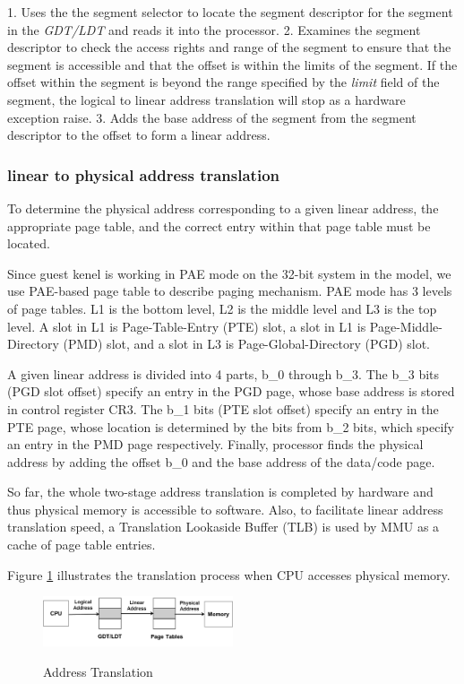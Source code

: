 1. Uses the the segment selector to locate the segment descriptor for the segment in the \emph{GDT/LDT} and reads it into the processor.
2. Examines the segment descriptor to check the access rights and range of the segment to ensure that the segment is accessible and that the offset is within the limits of the segment. If the offset within the segment is beyond the range specified by the \emph{limit} field of the segment, the logical to linear address translation will stop as a hardware exception raise.
3. Adds the base address of the segment from the segment descriptor to the offset to form a linear address.

\subsubsection{linear to physical address translation}
To determine the physical address corresponding to a given linear address, the appropriate page table, and the correct entry within that page table must be located.

Since guest kenel is working in PAE mode on the 32-bit system in the model, we use PAE-based page table to describe paging mechanism. PAE mode has 3 levels of page tables. L1 is the bottom level, L2 is the middle level and L3 is the top level. A slot in L1 is Page-Table-Entry (PTE) slot, a slot in L1 is Page-Middle-Directory (PMD) slot, and a slot in L3 is Page-Global-Directory (PGD) slot.

A given linear address is divided into 4 parts, b\_0 through b\_3. The b\_3 bits (PGD slot offset) specify an entry in the PGD page, whose base address is stored in control register CR3. The b\_1 bits (PTE slot offset) specify an entry in the PTE page, whose location is determined by the bits from b\_2 bits, which specify an entry in the PMD page respectively. Finally, processor finds the physical address by adding the offset b\_0 and the base address of the data/code page.

So far, the whole two-stage address translation is completed by hardware and thus physical memory is accessible to software. Also, to facilitate linear address translation speed, a Translation Lookaside Buffer (TLB) is used by MMU as a cache of page table entries.

Figure \ref{fig:address-translation} illustrates the translation process when CPU accesses physical memory.

\begin{figure}[ht]
\centering
\includegraphics[width=0.5\textwidth]{image/background/address-translation.png} \\
\caption{Address Translation}
\label{fig:address-translation}
\end{figure}

